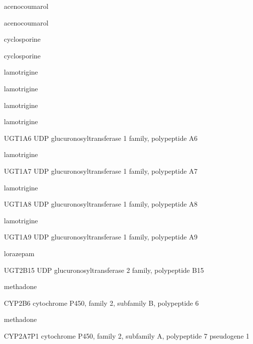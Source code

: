 \documentclass{resume} %
\begin{document}
\begin{rSection}{ acenocoumarol }
\begin{rSection}{ acenocoumarol }
\begin{rSection}{ cyclosporine }
\begin{rSection}{ cyclosporine }
\begin{rSection}{ lamotrigine }
\begin{rSection}{ lamotrigine }
\begin{rSection}{ lamotrigine }
\begin{rSection}{ lamotrigine }
\begin{rSubsection}{ UGT1A6 }{ UDP glucuronosyltransferase 1 family, polypeptide A6 }{}{}
\end{rSubsection}\begin{rSection}{ lamotrigine }
\item[]
\begin{rSubsection}{ UGT1A7 }{ UDP glucuronosyltransferase 1 family, polypeptide A7 }{}{}
\item[]


\end{rSubsection}\begin{rSection}{ lamotrigine }
\item[]
\begin{rSubsection}{ UGT1A8 }{ UDP glucuronosyltransferase 1 family, polypeptide A8 }{}{}
\item[]


\end{rSubsection}\begin{rSection}{ lamotrigine }
\item[]
\begin{rSubsection}{ UGT1A9 }{ UDP glucuronosyltransferase 1 family, polypeptide A9 }{}{}
\item[]


\end{rSubsection}

\end{rSection}\begin{rSection}{ lorazepam }
\item[]
\begin{rSubsection}{ UGT2B15 }{ UDP glucuronosyltransferase 2 family, polypeptide B15 }{}{}
\item[]


\end{rSubsection}

\end{rSection}\begin{rSection}{ methadone }
\item[]
\begin{rSubsection}{ CYP2B6 }{ cytochrome P450, family 2, subfamily B, polypeptide 6 }{}{}
\item[]


\end{rSubsection}\begin{rSection}{ methadone }
\item[]
\begin{rSubsection}{ CYP2A7P1 }{ cytochrome P450, family 2, subfamily A, polypeptide 7 pseudogene 1 }{}{}
\item[]


\end{rSubsection}


\end{rSection}
\end{rSection}
\end{rSection}
\end{rSection}
\end{rSection}
\end{rSection}
\end{rSection}
\end{rSection}
\end{rSection}
\end{rSection}
\end{rSection}
\end{rSection}
\end{document}
